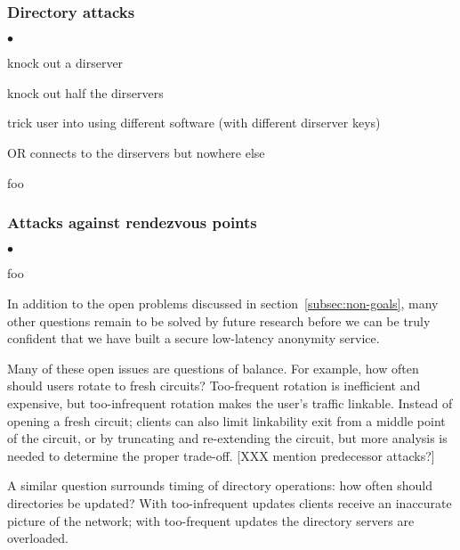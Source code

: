 \documentclass[times,10pt,twocolumn]{article}
\newenvironment{tightlist}{\begin{list}{$\bullet$}{
  \setlength{\itemsep}{0mm}
    \setlength{\parsep}{0mm}
    }}{\end{list}}
\begin{document}
\subsubsection*{Directory attacks}
\begin{tightlist}
\item knock out a dirserver
\item knock out half the dirservers
\item trick user into using different software (with different dirserver
keys)
\item OR connects to the dirservers but nowhere else
\item foo
\end{tightlist}

\subsubsection*{Attacks against rendezvous points}
\begin{tightlist}
\item foo
\end{tightlist}


\label{sec:maintaining-anonymity}
 
In addition to the open problems discussed in
section~\ref{subsec:non-goals}, many other questions remain to be
solved by future research before we can be truly confident that we
have built a secure low-latency anonymity service.

Many of these open issues are questions of balance.  For example,
how often should users rotate to fresh circuits?  Too-frequent
rotation is inefficient and expensive, but too-infrequent rotation
makes the user's traffic linkable.   Instead of opening a fresh
circuit; clients can also limit linkability exit from a middle point
of the circuit, or by truncating and re-extending the circuit, but
more analysis is needed to determine the proper trade-off.
[XXX mention predecessor attacks?]

A similar question surrounds timing of directory operations:
how often should directories be updated?  With too-infrequent
updates clients receive an inaccurate picture of the network; with
too-frequent updates the directory servers are overloaded.

%
\end{document}
